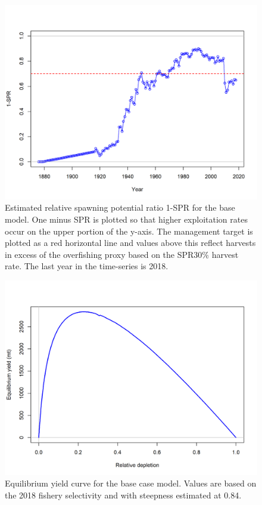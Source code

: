 \documentclass[12pt,]{article}
\begin{document}
\FloatBarrier  

\begin{figure}
\centering
\includegraphics{r4ss/plots_mod1/SPR2_minusSPRseries.png}
\caption{Estimated relative spawning potential ratio 1-SPR for the base
model. One minus SPR is plotted so that higher exploitation rates occur
on the upper portion of the y-axis. The management target is plotted as
a red horizontal line and values above this reflect harvests in excess
of the overfishing proxy based on the SPR30\% harvest rate. The last
year in the time-series is 2018. \label{fig:SPR_all_fig}}
\end{figure}

\FloatBarrier

\begin{figure}
\centering
\includegraphics{r4ss/plots_mod1/yield1_yield_curve.png}
\caption{Equilibrium yield curve for the base case model. Values are
based on the 2018 fishery selectivity and with steepness estimated at
0.84. \label{fig:yield}}
\end{figure}
\end{document}
